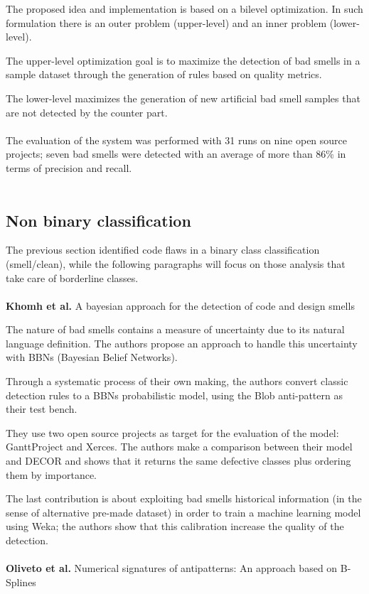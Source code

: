 The proposed idea and implementation is based on a bilevel optimization. In such formulation there is an outer problem (upper-level) and an inner problem (lower-level).

The upper-level optimization goal is to maximize the detection of bad smells in a sample dataset through the generation of rules based on quality metrics. 

The lower-level maximizes the generation of new artificial bad smell samples that are not detected by the counter part.
\\
\\
The evaluation of the system was performed with 31 runs on nine open source projects; seven bad smells were detected with an average of more than 86\% in terms of precision and recall.
\\
\\
\subsection{Non binary classification}
The previous section identified code flaws in a binary class classification (smell/clean), while the following paragraphs will focus on those analysis that take care of borderline classes.
\\
\\
\textbf{Khomh et al.} \cite{khomh2009bayesian} A bayesian approach for the detection of code and design smells
 
The nature of bad smells contains a measure of uncertainty due to its natural language definition. The authors propose an approach to handle this uncertainty with BBNs (Bayesian Belief Networks). 

Through a systematic process of their own making, the authors convert classic detection rules to a BBNs probabilistic model, using the Blob anti-pattern as their test bench.

They use two open source projects as target for the evaluation of the model: GanttProject and Xerces. The authors make a comparison between their model and DECOR and shows that it returns the same defective classes plus ordering them by importance.

The last contribution is about exploiting bad smells historical information (in the sense of alternative pre-made dataset) in order to train a machine learning model using Weka; the authors show that this calibration increase the quality of the detection.
\\
\\
\textbf{Oliveto et al.} \cite{oliveto2010numerical} Numerical signatures of antipatterns: An approach based on B-Splines

